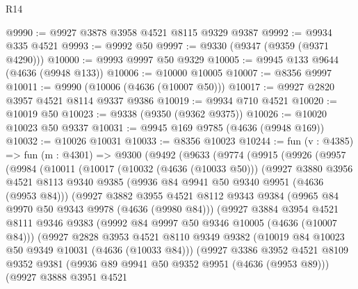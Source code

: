\begin{lexlean}{R14}
\begin{coremodule}
@9990 := @9927 @3878 @3958 @4521 @8115 @9329 @9387
@9992 := @9934 @335 @4521
@9993 := @9992 @50
@9997 := @9330 (@9347 (@9359 (@9371 @4290)))
@10000 := @9993 @9997 @50 @9329
@10005 := @9945 @133 @9644 (@4636 (@9948 @133))
@10006 := @10000 @10005
@10007 := @8356 @9997
@10011 := @9990 (@10006 (@4636 (@10007 @50)))
@10017 := @9927 @2820 @3957 @4521 @8114 @9337 @9386
@10019 := @9934 @710 @4521
@10020 := @10019 @50
@10023 := @9338 (@9350 (@9362 @9375))
@10026 := @10020 @10023 @50 @9337
@10031 := @9945 @169 @9785 (@4636 (@9948 @169))
@10032 := @10026 @10031
@10033 := @8356 @10023
@10244 := fun (v : @4385) =>
  fun (m : @4301) =>
  @9300
    (@9492
      (@9633
        (@9774
          (@9915
            (@9926
              (@9957
                (@9984
                  (@10011
                    (@10017
                      (@10032 (@4636 (@10033 @50)))
                      (@9927
                        @3880
                        @3956
                        @4521
                        @8113
                        @9340
                        @9385
                        (@9936 @84 @9941 @50 @9340 @9951 (@4636 (@9953 @84)))
                        (@9927
                          @3882
                          @3955
                          @4521
                          @8112
                          @9343
                          @9384
                          (@9965 @84 @9970 @50 @9343 @9978 (@4636 (@9980 @84)))
                          (@9927
                            @3884
                            @3954
                            @4521
                            @8111
                            @9346
                            @9383
                            (@9992 @84 @9997 @50 @9346 @10005 (@4636 (@10007 @84)))
                            (@9927
                              @2828
                              @3953
                              @4521
                              @8110
                              @9349
                              @9382
                              (@10019 @84 @10023 @50 @9349 @10031 (@4636 (@10033 @84)))
                              (@9927
                                @3386
                                @3952
                                @4521
                                @8109
                                @9352
                                @9381
                                (@9936 @89 @9941 @50 @9352 @9951 (@4636 (@9953 @89)))
                                (@9927
                                  @3888
                                  @3951
                                  @4521

\end{coremodule}
\end{lexlean}
